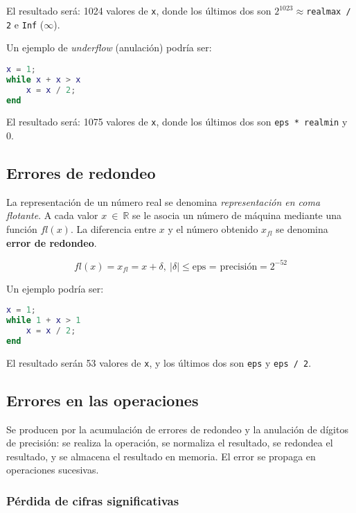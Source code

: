 \documentclass{article}
\begin{document}
El resultado será: 1024 valores de \verb|x|, donde los últimos dos son 
$2^{1023}\approx$\verb|realmax / 2| e \verb|Inf| ($\infty$).

Un ejemplo de \textit{underflow} (anulación) podría ser:

\begin{lstlisting}[language=Matlab]
x = 1;
while x + x > x
    x = x / 2;
end
\end{lstlisting}

El resultado será: 1075 valores de \verb|x|, donde los últimos dos son 
\verb|eps * realmin| y 0. 

\subsection{Errores de redondeo}

La representación de un número real se denomina \textit{representación en coma 
flotante}. A cada valor $x\ \in\ \mathbb{R}$ se le asocia un número de máquina 
mediante una función $fl(x)$. La diferencia entre $x$ y el número obtenido 
$x_{fl}$ se denomina \textbf{error de redondeo}.

\begin{equation*}
    fl(x) = x_{fl} = x + \delta,\ |\delta| \leq \text{eps = precisión} = 2^{-52}
\end{equation*}

Un ejemplo podría ser:

\begin{lstlisting}[language=Matlab]
x = 1;
while 1 + x > 1
    x = x / 2;
end
\end{lstlisting}

El resultado serán 53 valores de \verb|x|, y los últimos dos son \verb|eps| y 
\verb|eps / 2|.

\subsection{Errores en las operaciones}

Se producen por la acumulación de errores de redondeo y la anulación de dígitos 
de precisión: se realiza la operación, se normaliza el resultado, se redondea
el resultado, y se almacena el resultado en memoria. El error se propaga en
operaciones sucesivas.

\subsubsection{Pérdida de cifras significativas}
\end{document}

